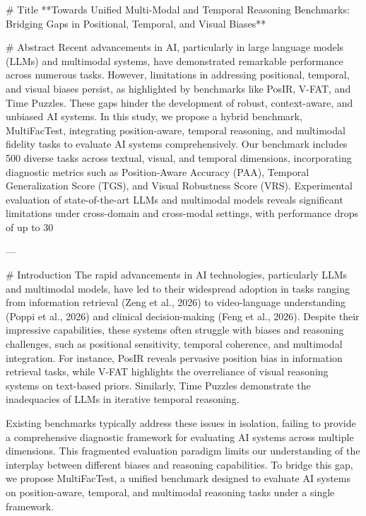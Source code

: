 # Title  
**Towards Unified Multi-Modal and Temporal Reasoning Benchmarks: Bridging Gaps in Positional, Temporal, and Visual Biases**

# Abstract  
Recent advancements in AI, particularly in large language models (LLMs) and multimodal systems, have demonstrated remarkable performance across numerous tasks. However, limitations in addressing positional, temporal, and visual biases persist, as highlighted by benchmarks like PosIR, V-FAT, and Time Puzzles. These gaps hinder the development of robust, context-aware, and unbiased AI systems. In this study, we propose a hybrid benchmark, MultiFacTest, integrating position-aware, temporal reasoning, and multimodal fidelity tasks to evaluate AI systems comprehensively. Our benchmark includes 500 diverse tasks across textual, visual, and temporal dimensions, incorporating diagnostic metrics such as Position-Aware Accuracy (PAA), Temporal Generalization Score (TGS), and Visual Robustness Score (VRS). Experimental evaluation of state-of-the-art LLMs and multimodal models reveals significant limitations under cross-domain and cross-modal settings, with performance drops of up to 30%

---

# Introduction  
The rapid advancements in AI technologies, particularly LLMs and multimodal models, have led to their widespread adoption in tasks ranging from information retrieval (Zeng et al., 2026) to video-language understanding (Poppi et al., 2026) and clinical decision-making (Feng et al., 2026). Despite their impressive capabilities, these systems often struggle with biases and reasoning challenges, such as positional sensitivity, temporal coherence, and multimodal integration. For instance, PosIR reveals pervasive position bias in information retrieval tasks, while V-FAT highlights the overreliance of visual reasoning systems on text-based priors. Similarly, Time Puzzles demonstrate the inadequacies of LLMs in iterative temporal reasoning.

Existing benchmarks typically address these issues in isolation, failing to provide a comprehensive diagnostic framework for evaluating AI systems across multiple dimensions. This fragmented evaluation paradigm limits our understanding of the interplay between different biases and reasoning capabilities. To bridge this gap, we propose MultiFacTest, a unified benchmark designed to evaluate AI systems on position-aware, temporal, and multimodal reasoning tasks under a single framework.

